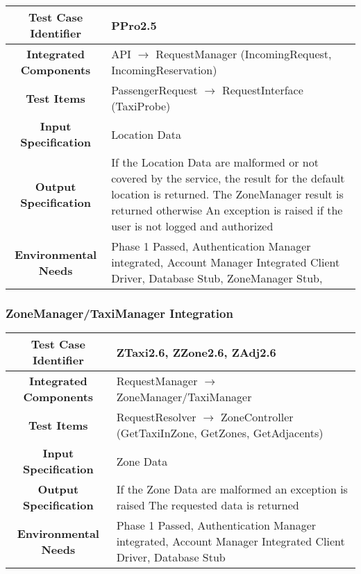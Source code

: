 \documentclass[11pt, a4paper,titlepage]{article}
\begin{document}
	 \begin{tabularx}{\textwidth}{| c|X|}
	 	\hline \textbf{Test Case Identifier} & \label{PPro2.5}PPro2.5 \\
	 	\hline \textbf{Integrated Components} & API  $\rightarrow $ RequestManager (IncomingRequest, IncomingReservation) \\
	 	\hline \textbf{Test Items} & PassengerRequest $\rightarrow $ RequestInterface (TaxiProbe) \\
	 	\hline \textbf{Input Specification} & Location Data \\
	 	\hline \textbf{Output Specification} & If the Location Data are malformed or not covered by the service, the result for the default location is returned. The ZoneManager result is returned otherwise \newline
	 	An exception is raised if the user is not logged and authorized \\
	 	\hline \textbf{Environmental Needs} &  Phase 1 Passed, Authentication Manager integrated, Account Manager Integrated \newline 
	 	Client Driver, Database Stub, ZoneManager Stub,\\
	 	\hline
	 \end{tabularx}
	 \newline
	 
	 \subsubsection{ZoneManager/TaxiManager Integration}
	 \begin{tabularx}{\textwidth}{| c|X|}
	 	\hline \textbf{Test Case Identifier} & \label{ZTaxi2.6}ZTaxi2.6, \label{ZZone2.6}ZZone2.6, \label{ZAdj2.6}ZAdj2.6 \\
	 	\hline \textbf{Integrated Components} & RequestManager  $\rightarrow $  ZoneManager/TaxiManager \\
	 	\hline \textbf{Test Items} & RequestResolver $\rightarrow $ ZoneController (GetTaxiInZone, GetZones, GetAdjacents) \\
	 	\hline \textbf{Input Specification} & Zone Data \\
	 	\hline \textbf{Output Specification} & If the Zone Data are malformed an exception is raised \newline
											The requested data is returned \\
	 	\hline \textbf{Environmental Needs} &  Phase 1 Passed, Authentication Manager integrated, Account Manager Integrated \newline 
	 	Client Driver, Database Stub\\
	 	\hline
	 	\end{tabularx}
	 	\newline
	 	
\end{document}
